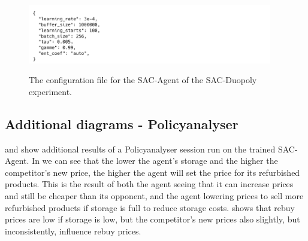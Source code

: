 \begin{figure}[ht]
	\includegraphics[width = 0.95\textwidth]{images/configs/SACDuopoly/SACDuopolyAgent.png}\\
	\caption{The configuration file for the SAC-Agent of the SAC-Duopoly experiment.}\label{fig:SACDuopolyConfigAgent}
\end{figure}

\clearpage
\subsection{Additional diagrams - Policyanalyser}\label{subsec:AppendixSACDuopolyPolicyanalyser}

 and  show additional results of a Policyanalyser session run on the trained SAC-Agent. In  we can see that the lower the agent's storage and the higher the competitor's new price, the higher the agent will set the price for its refurbished products. This is the result of both the agent seeing that it can increase prices and still be cheaper than its opponent, and the agent lowering prices to sell more refurbished products if storage is full to reduce storage costs.  shows that rebuy prices are low if storage is low, but the competitor's new prices also slightly, but inconsistently, influence rebuy prices.

